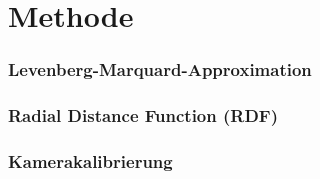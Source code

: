 \section{Methode}

\subsubsection{Levenberg-Marquard-Approximation}
\subsubsection{Radial Distance Function (RDF)}
\subsubsection{Kamerakalibrierung}


\newpage